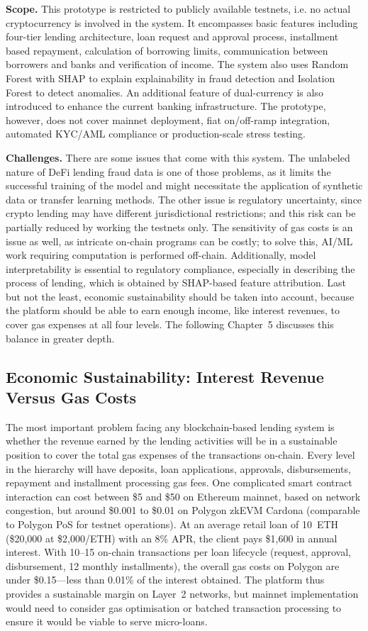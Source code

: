 \documentclass[12pt,a4paper]{report}
\begin{document}
\textbf{Scope.} This prototype is restricted to publicly available testnets, i.e. no actual cryptocurrency is involved in the system. It encompasses basic features including four-tier lending architecture, loan request and approval process, installment based repayment, calculation of borrowing limits, communication between borrowers and banks and verification of income. The system also uses Random Forest with SHAP to explain explainability in fraud detection and Isolation Forest to detect anomalies. An additional feature of dual-currency is also introduced to enhance the current banking infrastructure. The prototype, however, does not cover mainnet deployment, fiat on/off-ramp integration, automated KYC/AML compliance or production-scale stress testing.

\textbf{Challenges.} There are some issues that come with this system. The unlabeled nature of DeFi lending fraud data is one of those problems, as it limits the successful training of the model and might necessitate the application of synthetic data or transfer learning methods. The other issue is regulatory uncertainty, since crypto lending may have different jurisdictional restrictions; and this risk can be partially reduced by working the testnets only. The sensitivity of gas costs is an issue as well, as intricate on-chain programs can be costly; to solve this, AI/ML work requiring computation is performed off-chain. Additionally, model interpretability is essential to regulatory compliance, especially in describing the process of lending, which is obtained by SHAP-based feature attribution. Last but not the least, economic sustainability should be taken into account, because the platform should be able to earn enough income, like interest revenues, to cover gas expenses at all four levels. The following Chapter~5 discusses this balance in greater depth.

\subsection{Economic Sustainability: Interest Revenue Versus Gas Costs}

The most important problem facing any blockchain-based lending system is whether the revenue earned by the lending activities will be in a sustainable position to cover the total gas expenses of the transactions on-chain. Every level in the hierarchy will have deposits, loan applications, approvals, disbursements, repayment and installment processing gas fees. One complicated smart contract interaction can cost between \$5 and \$50 on Ethereum mainnet, based on network congestion, but around \$0.001 to \$0.01 on Polygon zkEVM Cardona (comparable to Polygon PoS for testnet operations). At an average retail loan of 10~ETH (\$20,000 at \$2,000/ETH) with an 8\% APR, the client pays \$1,600 in annual interest. With 10--15 on-chain transactions per loan lifecycle (request, approval, disbursement, 12 monthly installments), the overall gas costs on Polygon are under \$0.15---less than 0.01\% of the interest obtained. The platform thus provides a sustainable margin on Layer~2 networks, but mainnet implementation would need to consider gas optimisation or batched transaction processing to ensure it would be viable to serve micro-loans.
\end{document}

